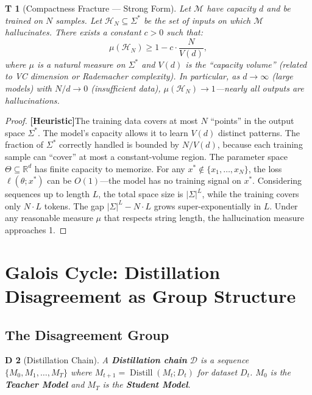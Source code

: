 \documentclass[12pt,a4paper]{article}
\newtheorem{theorem}Theorem[section]
\newtheorem{definition}[theorem]Definition
\theoremstyle{remark}
\newcommand{\R}{\mathbb{R}}
\DeclareMathOperator{\Distill}{Distill}
\newcommand{\heuristic}{\textnormal{\textbf{[Heuristic]}}}
\begin{document}
\begin{theorem}[Compactness Fracture --- Strong Form]\label{thm:compactness_fracture_strong}
Let \(\mathcal{M}\) have capacity \(d\) and be trained on \(N\) samples. Let \(\mathcal{H}_N \subseteq \Sigma^*\) be the set of inputs on which \(\mathcal{M}\) hallucinates. There exists a constant \(c > 0\) such that:
\begin{equation}\label{eq:fracture_bound}
    \mu(\mathcal{H}_N) \geq 1 - c \cdot \frac{N}{V(d)},
\end{equation}
where \(\mu\) is a natural measure on \(\Sigma^*\) and \(V(d)\) is the ``capacity volume'' (related to VC dimension or Rademacher complexity). In particular, as \(d \to \infty\) (large models) with \(N/d \to 0\) (insufficient data), \(\mu(\mathcal{H}_N) \to 1\)---nearly all outputs are hallucinations.
\end{theorem}
\begin{proof}
\heuristic The training data covers at most \(N\) ``points'' in the output space \(\Sigma^*\). The model's capacity allows it to learn \(V(d)\) distinct patterns. The fraction of \(\Sigma^*\) correctly handled is bounded by \(N / V(d)\), because each training sample can ``cover'' at most a constant-volume region. The parameter space \(\Theta \subseteq \R^d\) has finite capacity to memorize. For any \(x^* \notin \{x_1,\ldots,x_N\}\), the loss \(\ell(\theta; x^*)\) can be \(O(1)\)---the model has no training signal on \(x^*\). Considering sequences up to length \(L\), the total space size is \(|\Sigma|^L\), while the training covers only \(N \cdot L\) tokens. The gap \(|\Sigma|^L - N \cdot L\) grows super-exponentially in \(L\). Under any reasonable measure \(\mu\) that respects string length, the hallucination measure approaches 1.
\end{proof}
\section{Galois Cycle: Distillation Disagreement as Group Structure}
\subsection{The Disagreement Group}
\begin{definition}[Distillation Chain]
A \textbf{Distillation chain} \(\mathcal{D}\) is a sequence \(\{M_0, M_1, \ldots, M_T\}\) where \(M_{t+1} = \Distill(M_t; D_t)\) for dataset \(D_t\). \(M_0\) is the \textbf{Teacher Model} and \(M_T\) is the \textbf{Student Model}.
\end{definition}
\end{document}
